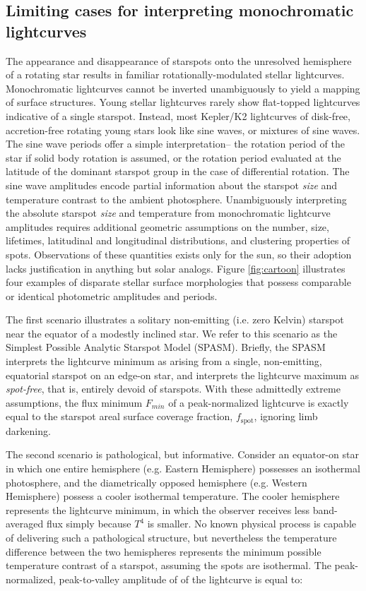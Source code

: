 \documentclass[twocolumn]{emulateapj}%
\begin{document}
\subsection{Limiting cases for interpreting monochromatic lightcurves}
The appearance and disappearance of starspots onto the unresolved hemisphere of a rotating star results in familiar rotationally-modulated stellar lightcurves.  Monochromatic lightcurves cannot be inverted unambiguously to yield a mapping of surface structures.  Young stellar lightcurves rarely show flat-topped lightcurves indicative of a single starspot.  Instead, most Kepler/K2 lightcurves of disk-free, accretion-free rotating young stars look like sine waves, or mixtures of sine waves.  The sine wave periods offer a simple interpretation-- the rotation period of the star if solid body rotation is assumed, or the rotation period evaluated at the latitude of the dominant starspot group in the case of differential rotation.  The sine wave amplitudes encode partial information about the starspot \emph{size} and temperature contrast to the ambient photosphere.  Unambiguously interpreting the absolute starspot \emph{size} and temperature from monochromatic lightcurve amplitudes requires additional geometric assumptions on the number, size, lifetimes, latitudinal and longitudinal distributions, and clustering properties of spots.  Observations of these quantities exists only for the sun, so their adoption lacks justification in anything but solar analogs.  Figure \ref{fig:cartoon} illustrates four examples of disparate stellar surface morphologies that possess comparable or identical photometric amplitudes and periods.

The first scenario illustrates a solitary non-emitting (i.e. zero Kelvin) starspot near the equator of a modestly inclined star.  We refer to this scenario as the Simplest Possible Analytic Starspot Model (SPASM).  Briefly, the SPASM interprets the lightcurve minimum as arising from a single, non-emitting, equatorial starspot on an edge-on star, and interprets the lightcurve maximum as \emph{spot-free}, that is, entirely devoid of starspots.  With these admittedly extreme assumptions, the flux minimum $F_{min}$ of a peak-normalized lightcurve is exactly equal to the starspot areal surface coverage fraction, $f_{\mathrm{spot}}$, ignoring limb darkening.

The second scenario is pathological, but informative.  Consider an equator-on star in which one entire hemisphere (e.g. Eastern Hemisphere) possesses an isothermal photosphere, and the diametrically opposed hemisphere (e.g. Western Hemisphere) possess a cooler isothermal temperature.  The cooler hemisphere represents the lightcurve minimum, in which the observer receives less band-averaged flux simply because $T^4$ is smaller.  No known physical process is capable of delivering such a pathological structure, but nevertheless the temperature difference between the two hemispheres represents the minimum possible temperature contrast of a starspot, assuming the spots are isothermal.  The peak-normalized, peak-to-valley amplitude of of the lightcurve is equal to:
\end{document}

